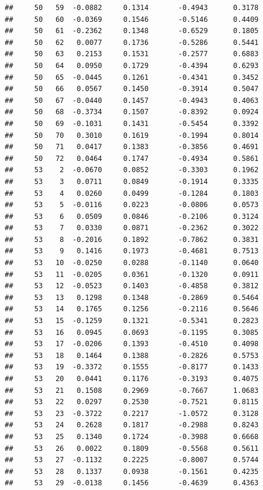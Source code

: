 \documentclass[
]{article}
\begin{document}
\begin{verbatim}
##     50   59  -0.0882     0.1314       -0.4943      0.3178  
##     50   60  -0.0369     0.1546       -0.5146      0.4409  
##     50   61  -0.2362     0.1348       -0.6529      0.1805  
##     50   62   0.0077     0.1736       -0.5286      0.5441  
##     50   63   0.2153     0.1531       -0.2577      0.6883  
##     50   64   0.0950     0.1729       -0.4394      0.6293  
##     50   65  -0.0445     0.1261       -0.4341      0.3452  
##     50   66   0.0567     0.1450       -0.3914      0.5047  
##     50   67  -0.0440     0.1457       -0.4943      0.4063  
##     50   68  -0.3734     0.1507       -0.8392      0.0924  
##     50   69  -0.1031     0.1431       -0.5454      0.3392  
##     50   70   0.3010     0.1619       -0.1994      0.8014  
##     50   71   0.0417     0.1383       -0.3856      0.4691  
##     50   72   0.0464     0.1747       -0.4934      0.5861  
##     53    2  -0.0670     0.0852       -0.3303      0.1962  
##     53    3   0.0711     0.0849       -0.1914      0.3335  
##     53    4   0.0260     0.0499       -0.1284      0.1803  
##     53    5  -0.0116     0.0223       -0.0806      0.0573  
##     53    6   0.0509     0.0846       -0.2106      0.3124  
##     53    7   0.0330     0.0871       -0.2362      0.3022  
##     53    8  -0.2016     0.1892       -0.7862      0.3831  
##     53    9   0.1416     0.1973       -0.4681      0.7513  
##     53   10  -0.0250     0.0288       -0.1140      0.0640  
##     53   11  -0.0205     0.0361       -0.1320      0.0911  
##     53   12  -0.0523     0.1403       -0.4858      0.3812  
##     53   13   0.1298     0.1348       -0.2869      0.5464  
##     53   14   0.1765     0.1256       -0.2116      0.5646  
##     53   15  -0.1259     0.1321       -0.5341      0.2823  
##     53   16   0.0945     0.0693       -0.1195      0.3085  
##     53   17  -0.0206     0.1393       -0.4510      0.4098  
##     53   18   0.1464     0.1388       -0.2826      0.5753  
##     53   19  -0.3372     0.1555       -0.8177      0.1433  
##     53   20   0.0441     0.1176       -0.3193      0.4075  
##     53   21   0.1508     0.2969       -0.7667      1.0683  
##     53   22   0.0297     0.2530       -0.7521      0.8115  
##     53   23  -0.3722     0.2217       -1.0572      0.3128  
##     53   24   0.2628     0.1817       -0.2988      0.8243  
##     53   25   0.1340     0.1724       -0.3988      0.6668  
##     53   26   0.0022     0.1809       -0.5568      0.5611  
##     53   27  -0.1132     0.2225       -0.8007      0.5744  
##     53   28   0.1337     0.0938       -0.1561      0.4235  
##     53   29  -0.0138     0.1456       -0.4639      0.4363  

\end{verbatim}
\end{document}
